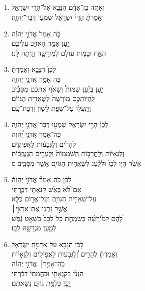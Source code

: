 \documentclass[12pt,a4paper,titlepage]{article}
\def \pscolor{red} %
\def \pslabelsep{-0.65em} %
\def \psleftmargin{0em} %
\begin{document}
\begin{hebrew}
      \subsection*{}
      \vspace{-0.6mm}
      \begin{enumerate}[leftmargin=\psleftmargin, labelsep=\pslabelsep, label=\fontspec{Linux Libertine}\arabic*, font=\color{\pscolor}\small\textsuperscript, parsep=0em, itemsep=0em, topsep=0em]
            \item וְאַתָּ֣ה בֶן־אָדָ֔ם הִנָּבֵ֖א אֶל־הָרֵ֣י יִשְׂרָאֵ֑ל \\ וְאָ֣מַרְתָּ֔ הָרֵי֙ יִשְׂרָאֵ֔ל שִׁמְע֖וּ דְּבַר־יְהוָֽה׃
            \item כֹּ֤ה אָמַר֙ אֲדֹנָ֣י יְהוִ֔ה \\ יַ֣עַן אָמַ֧ר הָאוֹיֵ֛ב עֲלֵיכֶ֖ם \\ הֶאָ֑ח וּבָמ֣וֹת עוֹלָ֔ם לְמֽוֹרָשָׁ֖ה הָ֥יְתָה לָּֽנוּ׃
            \item לָכֵן֙ הִנָּבֵ֣א וְאָמַרְתָּ֔ \\ כֹּ֥ה אָמַ֖ר אֲדֹנָ֣י יְהוִ֑ה \\ יַ֣עַן בְּיַ֡עַן שַׁמּוֹת֩ וְשָׁאֹ֙ף אֶתְכֶ֜ם מִסָּבִ֗יב \\ לִֽהְיוֹתְכֶ֤ם מֽוֹרָשָׁה֙ לִשְׁאֵרִ֣ית הַגּוֹיִ֔ם \\ וַתֵּֽעֲל֛וּ עַל־שְׂפַ֥ת לָשׁ֖וֹן וְדִבַּת־עָֽם׃
            \item לָכֵן֙ הָרֵ֣י יִשְׂרָאֵ֔ל שִׁמְע֖וּ דְּבַר־אֲדֹנָ֣י יְהוִ֑ה \\ כֹּֽה־אָמַ֣ר אֲדֹנָ֣י יְ֠הוִה \\ לֶהָרִ֙ים וְלַגְּבָע֜וֹת לָאֲפִיקִ֣ים \\ וְלַגֵּאָי֗וֹת וְלֶחֳרָב֤וֹת הַשֹּֽׁמְמוֹת֙ וְלֶעָרִ֣ים הַנֶּעֱזָב֔וֹת\\  אֲשֶׁ֙ר הָי֤וּ לְבַז֙ וּלְלַ֔עַג לִשְׁאֵרִ֥ית הַגּוֹיִ֖ם אֲשֶׁ֥ר מִסָּבִֽיב׃ ס
            \item לָכֵ֗ן כֹּֽה־אָמַר֘ אֲדֹנָ֣י יְהוִה֒ \\ אִם־לֹ֠א בְּאֵ֙שׁ קִנְאָתִ֥י דִבַּ֛רְתִּי \\ עַל־שְׁאֵרִ֥ית הַגּוֹיִ֖ם וְעַל־אֱד֣וֹם כֻּלָּ֑א \\ אֲשֶׁ֣ר נָתְנֽוּ־אֶת־אַרְצִ֣י׀ \\ לָ֠הֶם לְמ֙וֹרָשָׁ֜ה בְּשִׂמְחַ֤ת כָּל־לֵבָב֙ בִּשְׁאָ֣ט נֶ֔פֶשׁ \\ לְמַ֥עַן מִגְרָשָׁ֖הּ לָבַֽז׃
            \item לָכֵ֕ן הִנָּבֵ֖א עַל־אַדְמַ֣ת יִשְׂרָאֵ֑ל \\ וְאָמַרְתָּ֡ לֶהָרִ֣ים וְ֠לַגְּבָעוֹת לָאֲפִיקִ֙ים וְלַגֵּאָי֜וֹת \\ כֹּֽה־אָמַ֣ר׀ אֲדֹנָ֣י יְהוִ֗ה \\ הִנְנִ֙י בְקִנְאָתִ֤י וּבַחֲמָתִי֙ דִּבַּ֔רְתִּי \\ יַ֛עַן כְּלִמַּ֥ת גּוֹיִ֖ם נְשָׂאתֶֽם׃

\end{enumerate}
\end{hebrew}
\end{document}
